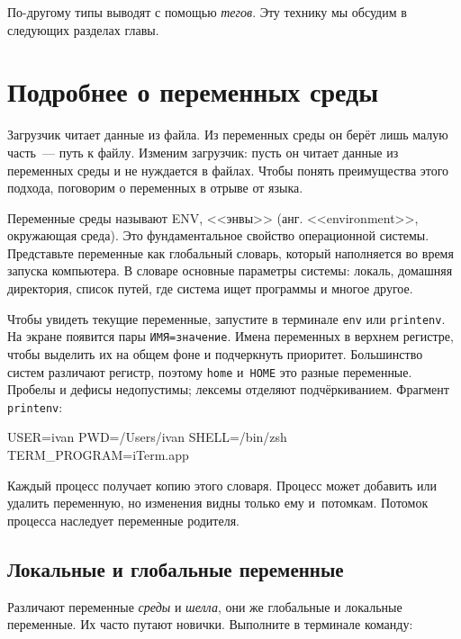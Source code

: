 По-другому типы выводят с помощью \emph{тегов}. Эту технику мы обсудим в
следующих разделах главы.

\section{Подробнее о переменных среды}


Загрузчик читает данные из файла. Из переменных среды он берёт лишь малую
часть~--- путь к файлу. Изменим загрузчик: пусть он читает данные из переменных
среды и не нуждается в файлах. Чтобы понять преимущества этого подхода,
поговорим о переменных в отрыве от языка.

Переменные среды называют ENV, <<энвы>> (анг. <<environment>>, окружающая
среда). Это фундаментальное свойство операционной системы. Представьте
переменные как глобальный словарь, который наполняется во время запуска
компьютера. В словаре основные параметры системы: локаль, домашняя директория,
список путей, где система ищет программы и многое другое.


Чтобы увидеть текущие переменные, запустите в терминале \verb|env| или
\verb|printenv|. На экране появится пары \verb|ИМЯ=значение|. Имена переменных в
верхнем регистре, чтобы выделить их на общем фоне и подчеркнуть
приоритет. Большинство систем различают регистр, поэтому \verb|home|
и~\verb|HOME| это разные переменные. Пробелы и дефисы недопустимы; лексемы
отделяют подчёркиванием. Фрагмент \verb|printenv|:

\begin{english}
  \begin{bash}
USER=ivan
PWD=/Users/ivan
SHELL=/bin/zsh
TERM_PROGRAM=iTerm.app
  \end{bash}
\end{english}

Каждый процесс получает копию этого словаря. Процесс может добавить или удалить
переменную, но изменения видны только ему и~потомкам. Потомок процесса наследует
переменные родителя.

\subsection{Локальные и глобальные переменные}


Различают переменные \emph{среды} и \emph{шелла}, они же глобальные и локальные
переменные. Их часто путают новички. Выполните в терминале команду:

